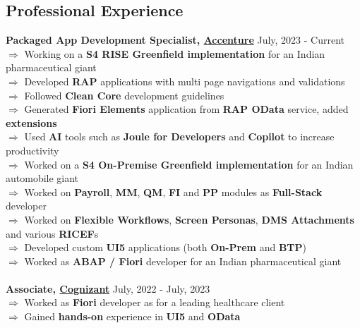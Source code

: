 \documentclass[margin, centered, a4paper]{res}
\begin{document}
\begin{resume}

\section{Professional Experience}
\textbf{Packaged App Development Specialist, \href{https://www.linkedin.com/company/accentureindia/}{Accenture}} \hfill{July, 2023 - Current}\\
$\Rightarrow$ Working on a \textbf{S4 RISE Greenfield implementation} for an Indian pharmaceutical giant\\
$\Rightarrow$ Developed \textbf{RAP} applications with multi page navigations and validations\\
$\Rightarrow$ Followed \textbf{Clean Core} development guidelines\\
$\Rightarrow$ Generated \textbf{Fiori Elements} application from \textbf{RAP OData} service, added \textbf{extensions}\\
$\Rightarrow$ Used \textbf{AI} tools such as \textbf{Joule for Developers} and \textbf{Copilot} to increase productivity\\
$\Rightarrow$ Worked on a \textbf{S4 On-Premise Greenfield implementation} for an Indian automobile giant\\
$\Rightarrow$ Worked on \textbf{Payroll}, \textbf{MM}, \textbf{QM}, \textbf{FI} and \textbf{PP} modules as \textbf{Full-Stack} developer\\
$\Rightarrow$ Worked on \textbf{Flexible Workflows}, \textbf{Screen Personas}, \textbf{DMS Attachments} and various \textbf{RICEF}s\\
$\Rightarrow$ Developed custom \textbf{UI5} applications (both \textbf{On-Prem} and \textbf{BTP})\\
$\Rightarrow$ Worked as \textbf{ABAP / Fiori} developer for an Indian pharmaceutical giant\\
\\
\textbf{Associate, \href{https://www.linkedin.com/company/cognizant}{Cognizant}} \hfill{July, 2022 - July, 2023}\\
$\Rightarrow$ Worked as \textbf{Fiori} developer as for a leading healthcare client\\
$\Rightarrow$ Gained \textbf{hands-on} experience in \textbf{UI5} and \textbf{OData}\\

\end{resume}
\end{document}
